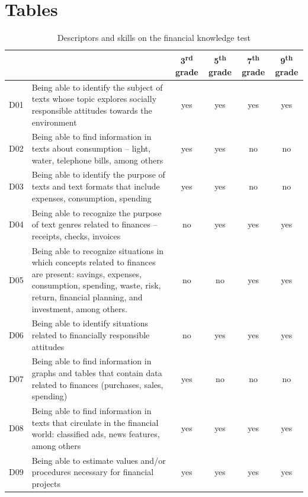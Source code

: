 \documentclass[
	article,			%
	12pt,				%
	oneside,			%
	a4paper,			%
	]{article}
\begin{document}

\appendix

\section{Tables}



\begin{table}[h!]
  \centering
  \fontsize{8}{11}\selectfont
  \caption{Descriptors and skills on the financial knowledge test}
    \begin{tabular}{lp{30.93em}cccc}
    \hline
 & \multicolumn{1}{r}{} & 3\textsuperscript{rd}  grade & 5\textsuperscript{th} grade    & 7\textsuperscript{th} grade  & 9\textsuperscript{th} grade  \\
    \hline
    D01   & Being able to identify the subject of texts whose topic explores socially responsible attitudes towards the environment  & yes   & yes   & yes   & yes \\
    D02   & Being able to find information in texts about consumption – light, water, telephone bills, among others  & yes   & yes   & no    & no \\
    D03   & Being able to identify the purpose of texts and text formats that include expenses, consumption, spending  & yes   & yes   & no    & no \\
    D04   & Being able to recognize the purpose of text genres related to finances – receipts, checks, invoices & no    & yes   & yes   & yes \\
    D05   & Being able to recognize situations in which concepts related to finances are present: savings, expenses, consumption, spending, waste, risk, return, financial planning, and investment, among others.  & no    & no    & yes   & yes \\
    D06   & Being able to identify situations related to financially responsible attitudes  & no    & yes   & yes   & yes \\
    D07   & Being able to find information in graphs and tables that contain data related to finances (purchases, sales, spending) & yes   & no    & no    & no \\
    D08   & Being able to find information in texts that circulate in the financial world: classified ads, news features, among others & yes   & yes   & yes   & yes \\
    D09   & Being able to estimate values and/or procedures necessary for financial projects & yes   & yes   & yes   & yes \\

\end{tabular}
\end{table}
\end{document}
